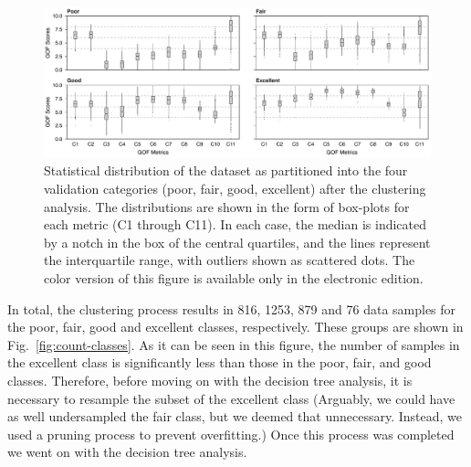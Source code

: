 \begin{figure}
	\centering
	\includegraphics[width=\textwidth]{figures/pdf/figure-06_mod}
	\caption{Statistical distribution of the dataset as partitioned into the four validation categories (poor, fair, good, excellent) after the clustering analysis. The distributions are shown in the form of box-plots for each metric (C1 through C11). In each case, the median is indicated by a notch in the box of the central quartiles, and the lines represent the interquartile range, with outliers shown as scattered dots. The color version of this figure is available only in the electronic edition. }
	\label{fig:boxed-clusters}
\end{figure}

In total, the clustering process results in 816, 1253, 879 and 76 data samples for the poor, fair, good and excellent classes, respectively. These groups are shown in Fig.~\ref{fig:count-classes}. As it can be seen in this figure, the number of samples in the excellent class is significantly less than those in the poor, fair, and good classes. Therefore, before moving on with the decision tree analysis, it is necessary to resample the subset of the excellent class (Arguably, we could have as well undersampled the fair class, but we deemed that unnecessary. Instead, we used a  pruning process to prevent overfitting.) Once this process was completed we went on with the decision tree analysis.

